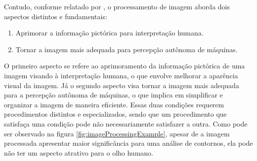 Contudo, conforme relatado por \textcite{mcandrew2004introduction}, o processamento de imagem aborda dois aspectos distintos e fundamentais:
\begin{enumerate}
\item Aprimorar a informação pictórica para interpretação humana.
\item Tornar a imagem mais adequada para percepção autônoma de máquinas.
\end{enumerate}
O primeiro aspecto se refere ao aprimoramento da informação pictórica de uma imagem visando à interpretação humana, o que envolve melhorar a aparência visual da imagem. Já o segundo aspecto visa tornar a imagem mais adequada para a percepção autônoma de máquinas, o que implica em simplificar e organizar a imagem de maneira eficiente. Essas duas condições requerem procedimentos distintos e especializados, sendo que um procedimento que satisfaça uma condição pode não necessariamente satisfazer a outra. Como pode ser observado na figura \ref{fig:imageProcessingExample}, apesar de a imagem processada apresentar maior significância para uma análise de contornos, ela pode não ter um aspecto atrativo para o olho humano.

